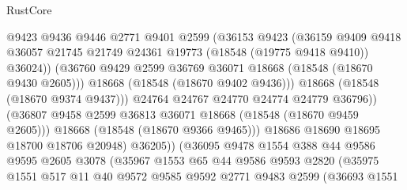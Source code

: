 \begin{lexlean}{RustCore}
\begin{coremodule}
                                @9423
                                @9436
                                @9446
                                @2771
                                @9401
                                @2599
                                (@36153
                                  @9423
                                  (@36159
                                    @9409
                                    @9418
                                    @36057
                                    @21745
                                    @21749
                                    @24361
                                    @19773
                                    (@18548 (@19775 @9418 @9410))
                                    @36024))
                                (@36760
                                  @9429
                                  @2599
                                  @36769
                                  @36071
                                  @18668
                                  (@18548 (@18670 @9430 @2605)))
                                @18668
                                (@18548 (@18670 @9402 @9436)))
                              @18668
                              (@18548 (@18670 @9374 @9437)))
                            @24764
                            @24767
                            @24770
                            @24774
                            @24779
                            @36796))
                        (@36807 @9458 @2599 @36813 @36071 @18668 (@18548 (@18670 @9459 @2605)))
                        @18668
                        (@18548 (@18670 @9366 @9465)))
                      @18686
                      @18690
                      @18695
                      @18700
                      @18706
                      @20948)
                    @36205))
                (@36095
                  @9478
                  @1554
                  @388
                  @44
                  @9586
                  @9595
                  @2605
                  @3078
                  (@35967
                    @1553
                    @65
                    @44
                    @9586
                    @9593
                    @2820
                    (@35975
                      @1551
                      @517
                      @11
                      @40
                      @9572
                      @9585
                      @9592
                      @2771
                      @9483
                      @2599
                      (@36693
                        @1551

\end{coremodule}
\end{lexlean}

